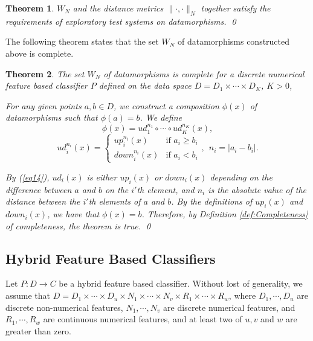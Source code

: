 \documentclass[preprint,1p,authoryear,times]{elsarticle}
\newtheorem{Theorem} {Theorem}
\begin{document}
\begin{Theorem}\label{thm:Thm2_3}
$W_N$ and the distance metrics $\|\cdot,\cdot\|_N$ together satisfy the requirements of exploratory test systems on datamorphisms. \qed
\end{Theorem} 

The following theorem states that the set $W_N$ of datamorphisms constructed above is complete. 

\begin{Theorem}\label{thm:Thm2_4}
The set $W_N$ of datamorphisms is complete for a discrete numerical feature based classifier $P$ defined on the data space $D = D_1 \times \cdots \times D_K$, $K>0$, 

For any given points $a, b \in D$, we construct a composition $\phi(x)$ of datamorphisms such that $\phi(a) = b$. 
We define 
\begin{equation}
\phi(x) = ud^{n_1}_1 \circ \cdots \circ ud^{n_K}_K(x),
\end{equation}
\begin{equation}
ud^{n_i}_i(x) = \left\{ \begin{array}{ll}
up^{n_i}_i(x) & \textrm{if $a_i \geq b_i$}\\ \label{eq14}
down^{n_i}_i(x) & \textrm{if $a_i < b_i$}
\end{array} \right., ~~n_i = |a_i -b_i|. 
\end{equation}

By (\ref{eq14}), $ud_i(x)$ is either $up_i(x)$ or $down_i(x)$ depending on the difference between $a$ and $b$ on the $i'$th element, and $n_i$ is the absolute value of the distance between the $i'$th elements of $a$ and $b$. By the definitions of $up_i(x)$ and $down_i(x)$, we have that $\phi(x) = b$. Therefore, by Definition \ref{def:Completeness} of completeness, the theorem is true. \qed
\end{Theorem}

\subsection{Hybrid Feature Based Classifiers}

Let $P: D \rightarrow C$ be a hybrid feature based classifier. Without lost of generality, we assume that $D = D_1 \times \cdots \times D_u \times N_1 \times \cdots \times N_v \times R_1 \times \cdots \times R_w$, where $D_1, \cdots, D_u$ are discrete non-numerical features, $N_1, \cdots, N_v$ are discrete numerical features, and $R_1, \cdots, R_w$ are continuous numerical features, and at least two of $u, v$ and $w$ are greater than zero. 
\end{document}
